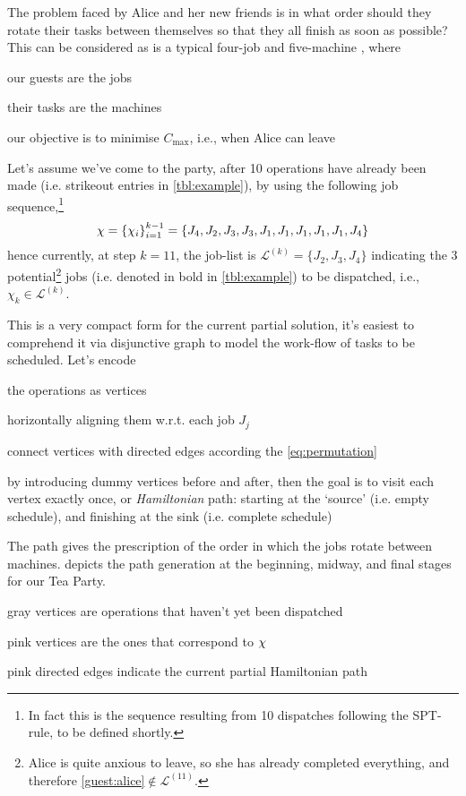 The problem faced by Alice and her new friends is in what order should they 
rotate their tasks between themselves so that they all finish as soon as 
possible? This can be considered as is a typical four-job and five-machine 
\jsp, where
\begin{enumerate*}[label={{}}]
    \item our guests are the jobs
    \item their tasks are the machines
    \item our objective is to minimise $C_{\max}$, i.e., when Alice can 
    leave
\end{enumerate*}

Let's assume we've come to the party, after 10 operations have already been 
made (i.e. strikeout entries in \cref{tbl:example}), by using the following 
job sequence,\footnote{In fact this is the sequence resulting from 10 
    dispatches following the SPT-rule, to be defined shortly.}
\begin{equation}
\vchi = \left\{ \chi_i \right\}_{i=1}^{k-1} \label{eq:vchi:example}
= \left\{ J_4,J_2,J_3,J_3,J_1,J_1,J_1,J_1,J_1,J_4 \right\}
\end{equation}
hence currently, at step $k=11$, the job-list is 
$\mathcal{L}^{(k)}=\{J_2,J_3,J_4\}$ indicating the 3 potential\footnote{
    Alice is quite anxious to leave, so she has already completed everything, 
    and therefore \ref{guest:alice}$\notin\mathcal{L}^{(11)}$.} 
jobs (i.e. denoted in bold in \cref{tbl:example}) to be dispatched, i.e., 
$\chi_k\in\mathcal{L}^{(k)}$.



This is a very compact form for the current partial solution, it's easiest to 
comprehend it via disjunctive graph \citep{roy64} to model the work-flow of 
tasks to be scheduled.
Let's encode
\begin{enumerate*}
    \item the operations as vertices
    \item horizontally aligning them w.r.t. each job $J_j$
    \item connect vertices with directed edges according the 
    \cref{eq:permutation}
    \item by introducing dummy vertices before and after, then the goal is to 
    visit each vertex exactly once, or \emph{Hamiltonian} path: starting at the 
    `source'  (i.e. empty schedule), and finishing at the sink (i.e. complete 
    schedule)
\end{enumerate*}
The path gives the prescription of the order in which the jobs rotate 
between machines. 
 depicts the path generation at the beginning, midway, 
and final stages for our Tea Party. 
\begin{enumerate*}
    \item gray vertices are operations that haven't yet been dispatched
    \item pink vertices are the ones that correspond to ${\mathbf{\chi}}$
    \item pink directed edges indicate the current partial Hamiltonian path
\end{enumerate*}

